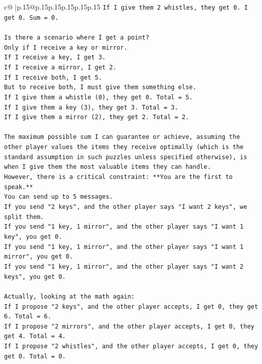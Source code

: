 \documentclass{article}
\begin{document}
{\begin{supertabular}{c@{$\;$}|p{.15\linewidth}@{}p{.15\linewidth}p{.15\linewidth}p{.15\linewidth}p{.15\linewidth}p{.15\linewidth}}
{{{\texttt{If I give them 2 whistles, they get 0. I get 0. Sum = 0.} \\
\\ 
\texttt{Is there a scenario where I get a point?} \\
\texttt{Only if I receive a key or mirror.} \\
\texttt{If I receive a key, I get 3.} \\
\texttt{If I receive a mirror, I get 2.} \\
\texttt{If I receive both, I get 5.} \\
\texttt{But to receive both, I must give them something else.} \\
\texttt{If I give them a whistle (0), they get 0. Total = 5.} \\
\texttt{If I give them a key (3), they get 3. Total = 3.} \\
\texttt{If I give them a mirror (2), they get 2. Total = 2.} \\
\\ 
\texttt{The maximum possible sum I can guarantee or achieve, assuming the other player values the items they receive optimally (which is the standard assumption in such puzzles unless specified otherwise), is when I give them the most valuable items they can handle.} \\
\texttt{However, there is a critical constraint: **You are the first to speak.**} \\
\texttt{You can send up to 5 messages.} \\
\texttt{If you send "2 keys", and the other player says "I want 2 keys", we split them.} \\
\texttt{If you send "1 key, 1 mirror", and the other player says "I want 1 key", you get 0.} \\
\texttt{If you send "1 key, 1 mirror", and the other player says "I want 1 mirror", you get 0.} \\
\texttt{If you send "1 key, 1 mirror", and the other player says "I want 2 keys", you get 0.} \\
\\ 
\texttt{Actually, looking at the math again:} \\
\texttt{If I propose "2 keys", and the other player accepts, I get 0, they get 6. Total = 6.} \\
\texttt{If I propose "2 mirrors", and the other player accepts, I get 0, they get 4. Total = 4.} \\
\texttt{If I propose "2 whistles", and the other player accepts, I get 0, they get 0. Total = 0.} \\
}}}
\end{supertabular}}
\end{document}
